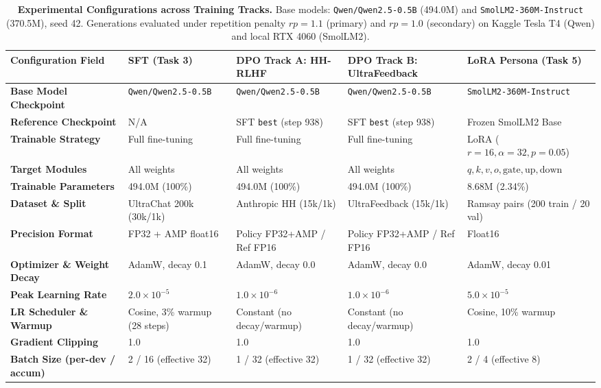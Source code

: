 \documentclass[11pt,a4paper]{article}
\begin{document}
\begin{table}[t]
\centering
\scriptsize
\setlength{\tabcolsep}{2.5pt}
\renewcommand{\arraystretch}{0.86}
\caption{\textbf{Experimental Configurations across Training Tracks.} Base models: \texttt{Qwen/Qwen2.5-0.5B} (494.0M) and \texttt{SmolLM2-360M-Instruct} (370.5M), seed 42. Generations evaluated under repetition penalty $rp=1.1$ (primary) and $rp=1.0$ (secondary) on Kaggle Tesla T4 (Qwen) and local RTX 4060 (SmolLM2).}
\label{tab:config}
\begin{tabularx}{\textwidth}{lXXXX}
\toprule
\textbf{Configuration Field} & \textbf{SFT (Task 3)} & \textbf{DPO Track A: HH-RLHF} & \textbf{DPO Track B: UltraFeedback} & \textbf{LoRA Persona (Task 5)} \\
\midrule
\textbf{Base Model Checkpoint} & \texttt{Qwen/Qwen2.5-0.5B} & \texttt{Qwen/Qwen2.5-0.5B} & \texttt{Qwen/Qwen2.5-0.5B} & \texttt{SmolLM2-360M-Instruct} \\
\textbf{Reference Checkpoint} & N/A & SFT \texttt{best} (step 938) & SFT \texttt{best} (step 938) & Frozen SmolLM2 Base \\
\textbf{Trainable Strategy} & Full fine-tuning & Full fine-tuning & Full fine-tuning & LoRA ($r=16, \alpha=32, p=0.05$) \\
\textbf{Target Modules} & All weights & All weights & All weights & $q, k, v, o, \text{gate}, \text{up}, \text{down}$ \\
\textbf{Trainable Parameters} & 494.0M (100\%) & 494.0M (100\%) & 494.0M (100\%) & 8.68M (2.34\%) \\
\textbf{Dataset \& Split} & UltraChat 200k (30k/1k) & Anthropic HH (15k/1k) & UltraFeedback (15k/1k) & Ramsay pairs (200 train / 20 val) \\
\textbf{Precision Format} & FP32 + AMP float16 & Policy FP32+AMP / Ref FP16 & Policy FP32+AMP / Ref FP16 & Float16 \\
\textbf{Optimizer \& Weight Decay} & AdamW, decay 0.1 & AdamW, decay 0.0 & AdamW, decay 0.0 & AdamW, decay 0.01 \\
\textbf{Peak Learning Rate} & $2.0 \times 10^{-5}$ & $1.0 \times 10^{-6}$ & $1.0 \times 10^{-6}$ & $5.0 \times 10^{-5}$ \\
\textbf{LR Scheduler \& Warmup} & Cosine, 3\% warmup (28 steps) & Constant (no decay/warmup) & Constant (no decay/warmup) & Cosine, 10\% warmup \\
\textbf{Gradient Clipping} & 1.0 & 1.0 & 1.0 & 1.0 \\
\textbf{Batch Size (per-dev / accum)} & 2 / 16 (effective 32) & 1 / 32 (effective 32) & 1 / 32 (effective 32) & 2 / 4 (effective 8) \\

\end{tabularx}
\end{table}
\end{document}
